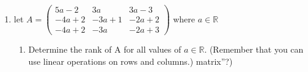 \documentclass[12pt,twoside]{article}
\newcommand{\blue}[1]{{\leavevmode\color{blue}{#1}}}
\begin{document}
\begin{enumerate}[label=3.3]
\item
let $A=\begin{pmatrix}
5a - 2 & 3a & 3a - 3\\
-4a + 2 & -3a + 1&  -2a + 2\\
-4a + 2 & -3a &  -2a + 3
\end{pmatrix}$ where $a\in\mathbb{R}$
\begin{enumerate}[label = (a)]
    \item Determine the rank of A for all values of $a\in \mathbb{R}$. (Remember that you can use linear
operations on rows and columns.)
matrix”?)
\blue{
\begin{itemize}
    \item \begin{pmatrix}
5a - 2 & 3a & 3a - 3\\
-4a + 2 & -3a + 1&  -2a + 2\\
-4a + 2 & -3a &  -2a + 3
\end{pmatrix} we can subtract row 3 from row 2. 


\end{itemize}}
\end{enumerate}
\end{enumerate}
\end{document}
